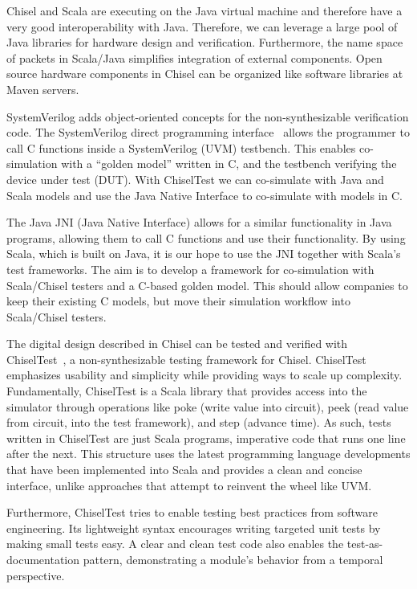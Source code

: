 \documentclass[conference]{IEEEtran}
\begin{document}
Chisel and Scala are executing on the Java virtual machine and therefore have a very good
interoperability with Java. Therefore, we can leverage a large pool of Java libraries for
hardware design and  verification.
Furthermore, the name space of packets in Scala/Java simplifies integration of
external components.
Open source hardware components in Chisel can be organized like software
libraries at Maven servers.






SystemVerilog adds object-oriented concepts for the non-synthesizable verification code.
The SystemVerilog direct programming interface~\cite{Doulos:SV:dpi} allows the programmer to call
C functions inside a SystemVerilog (UVM) testbench.
This enables co-simulation with a ``golden model'' written in C, and the
testbench verifying the device under test (DUT).
With ChiselTest we can co-simulate with Java and Scala models and use the Java Native Interface
to co-simulate with models in C.

The Java JNI (Java Native Interface) allows for a similar functionality in Java programs,
allowing them to call C functions and use their functionality.
By using Scala, which is built on Java, it is our hope to use the JNI together with Scala's test frameworks.
The aim is to develop a framework for co-simulation with Scala/Chisel testers and a
C-based golden model. This should allow companies to keep their existing C models,
but move their simulation workflow into Scala/Chisel testers.

The digital design described in Chisel can be tested and verified with
ChiselTest~\cite{chisel:tester2}, a non-synthesizable testing framework for Chisel.
ChiselTest emphasizes usability and simplicity while providing ways to scale up complexity.
Fundamentally, ChiselTest is a Scala library that provides access into the simulator through
operations like poke (write value into circuit), peek (read value from circuit, into the test framework), and step (advance time).
As such, tests written in ChiselTest are just Scala programs, imperative code that runs one line after the next.
This structure uses the latest programming language developments that have been implemented into Scala
and provides a clean and concise interface, unlike approaches that attempt to reinvent the wheel like UVM.

Furthermore, ChiselTest tries to enable testing best practices from software engineering.
Its lightweight syntax encourages writing targeted unit tests by making small tests easy.
A clear and clean test code also enables the test-as-documentation pattern,
demonstrating a module's behavior from a temporal perspective.
\end{document}

